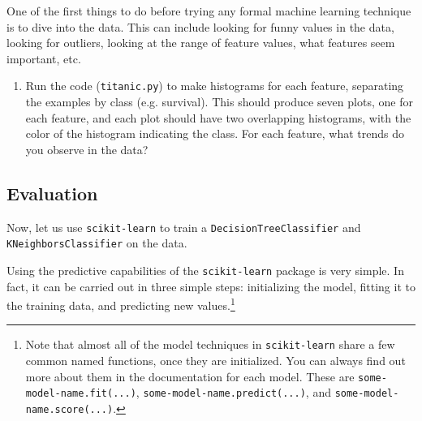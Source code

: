 One of the first things to do before trying any formal machine learning technique is to dive into the data. This can include looking for funny values in the data, looking for outliers, looking at the range of feature values, what features seem important, etc.

\begin{enumerate}
\item {} Run the code (\verb|titanic.py|) to make histograms for each feature, separating the examples by class (e.g. survival). This should produce seven plots, one for each feature, and each plot should have two overlapping histograms, with the color of the histogram indicating the class. For each feature, what trends do you observe in the data? 
\end{enumerate}

\ifsolution{\newpage}
\subsection{Evaluation }

Now, let us use \verb|scikit-learn| to train a \verb|DecisionTreeClassifier| and \verb|KNeighborsClassifier| on the data.

Using the predictive capabilities of the \verb|scikit-learn| package is very simple. In fact, it can be carried out in three simple steps: initializing the model, fitting it to the training data, and predicting new values.\footnote{Note that almost all of the model techniques in \verb|scikit-learn| share a few common named functions, once they are initialized. You can always find out more about them in the documentation for each model. These are \verb|some-model-name.fit(...)|, \verb|some-model-name.predict(...)|, and \verb|some-model-name.score(...)|.}


